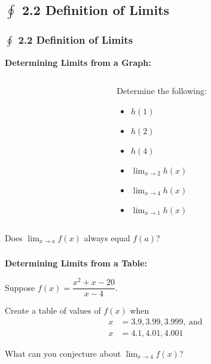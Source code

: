 \documentclass[14pt]{beamer}
\begin{document}
\begin{frame}
\subsection[2.2 Definition of Limits]{$\oint$ 2.2 Definition of Limits}
\frametitle{$\oint$ 2.2 Definition of Limits}
{\bf Determining Limits from a Graph:}
\begin{columns}[T]
\begin{column}{.5\textwidth}
\begin{block}
\end{block}
\end{column}
\begin{column}{.5\textwidth}
\begin{block}
{Determine the following:}
\begin{itemize}
\item[1.] $h(1)$
\item[2.] $h(2)$
\item[3.] $h(4)$
\item[4.] $\displaystyle\lim_{x \to 2} h(x)$
\item[5.] $\displaystyle\lim_{x \to 4} h(x)$
\item[6.] $\displaystyle\lim_{x \to 1} h(x)$
\end{itemize}
\end{block}
\end{column}
\end{columns}
\end{frame}

\begin{frame}
\begin{que} Does $\displaystyle\lim_{x \to a} f(x)$ always equal $f(a)$? \end{que}
\end{frame}

\begin{frame}
\frametitle{}
{\bf Determining Limits from a Table:}

\vspace{1.5pc}
\small 
Suppose $f(x)=\dfrac{x^2+x-20}{x-4}.$

\vspace{1pc}
Create a table of values of $f(x)$ when
\begin{alignat*}{3}
x &= 3.9, 3.99, 3.999,\ \text{and}\\
x &= 4.1, 4.01, 4.001
\end{alignat*}
\begin{que}What can you conjecture about $\displaystyle\lim_{x \to 4} f(x)$? \end{que}
\end{frame}
\end{document}
